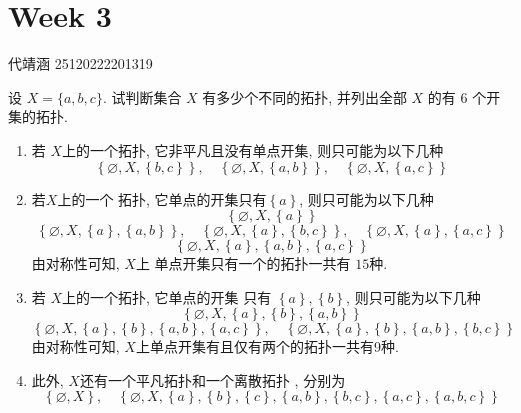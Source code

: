 \documentclass[../main.tex]{subfiles}
\begin{document}
\ifSubfilesClassLoaded{

    
    \setcounter{chapter}{2}
}{}

\chapter{ Week 3 }
代靖涵 25120222201319
\begin{exercise}{}{}
设 $X = \{a, b, c\}$. 试判断集合 $X$ 有多少个不同的拓扑, 并列出全部 $X$ 的有 6 个开集的拓扑.
\end{exercise}
\begin{solution}
        \begin{enumerate}
        \item 若 \(  X  \)上的一个拓扑,  它非平凡且没有单点开集, 则只可能为以下几种 \[
        \left\{ \varnothing,X, \left\{ b,c \right\} \right\},\quad \left\{ \varnothing,X,\left\{ a,b \right\} \right\},\quad \left\{ \varnothing,X, \left\{ a,c \right\} \right\}
        \]
        \item 若\(  X  \)上的一个 拓扑, 它单点的开集只有\(  \left\{ a \right\}  \),  则只可能为以下几种 \[
        \left\{ \varnothing,X, \left\{ a \right\} \right\}
        \]\[
        \left\{ \varnothing, X, \left\{ a \right\}, \left\{ a,b \right\} \right\},\quad \left\{ \varnothing,X , \left\{ a \right\}, \left\{ b,c \right\} \right\},\quad \left\{ \varnothing,X,\left\{ a \right\},\left\{ a,c \right\} \right\}
        \] \[
        \left\{ \varnothing,X, \left\{ a \right\}, \left\{ a,b \right\},\left\{ a,c \right\} \right\}
        \]由对称性可知, \(  X  \)上 单点开集只有一个的拓扑一共有 \(  15  \)种.
        \item 若 \(  X  \)上的一个拓扑, 它单点的开集 只有 \(  \left\{ a \right\}, \left\{ b \right\}  \), 则只可能为以下几种 \[
        \left\{ \varnothing,X,\left\{ a \right\},\left\{ b \right\},\left\{ a,b \right\} \right\}
        \]     \[
         \left\{ \varnothing,X,\left\{ a \right\},\left\{ b \right\},\left\{ a,b \right\}, \left\{ a,c \right\} \right\},\quad  \left\{ \varnothing,X,\left\{ a \right\},\left\{ b \right\},\left\{ a,b \right\} , \left\{ b,c \right\}\right\}
        \]由对称性可知, \(  X  \)上单点开集有且仅有两个的拓扑一共有9种.
        \item 此外,  \(  X  \)还有一个平凡拓扑和一个离散拓扑 , 分别为 \[
        \left\{ \varnothing,X \right\},\quad \left\{ \varnothing,X,\left\{ a \right\},\left\{ b \right\},\left\{ c \right\},\left\{ a,b \right\},\left\{ b,c \right\},\left\{ a,c \right\},\left\{ a,b,c \right\} \right\}
\]
\end{enumerate}
\end{solution}
\end{document}
